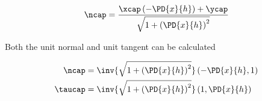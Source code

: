 \begin{equation}\label{eqn:continuumL13:n}
\ncap = 
\frac{\xcap \left( -\PD{x}{h} \right) + \ycap}{
\sqrt{ 1 + \left( \PD{x}{h} \right)^2 }
}
\end{equation}

Both the unit normal and unit tangent can be calculated

\begin{align}\label{eqn:continuumL13:n}
\ncap &= 
\inv{
\sqrt{ 1 + \left( \PD{x}{h} \right)^2 }
}
\left( -\PD{x}{h}, 1 \right)  \\
\taucap &= 
\inv{
\sqrt{ 1 + \left( \PD{x}{h} \right)^2 }
}
\left( 1, \PD{x}{h} \right)
\end{align}

\EndArticle
